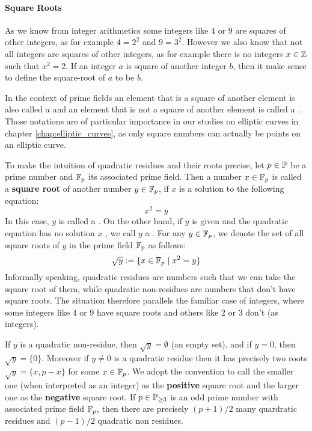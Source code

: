 \paragraph{Square Roots} As we know from integer arithmetics some integers like $4$ or $9$ are squares of other integers, as for example $4=2^2$ and $9=3^2$. However we also know that not all integers are squares of other integers, as for example there is no integers $x\in\mathbb{Z}$ such that $x^2=2$. If an integer $a$ is square of another integer $b$, then it make sense to define the square-root of $a$ to be $b$.

In the context of prime fields an element that is a square of another element is also called a  and an element that is not a square of another element is called a . Those notations are of particular importance in our studies on elliptic curves in chapter \ref{chap:elliptic_curves}, as only square numbers can actually be points on an elliptic curve.

To make the intuition of quadratic residues and their roots precise, let $p \in \mathbb{P} $ be a prime number and $\mathbb{F}_p $ its associated prime field. Then a number $x\in \mathbb{F}_p$ is called a \textbf{square root} of another number $y\in\mathbb{F}_p$, if $x$ is a solution to the following equation:
\begin{equation}
x^2 = y
\end{equation}
In this case, $y$ is called a . On the other hand, if $y$ is given and the quadratic equation has no solution $x$ , we call $ y $ a . For any $ y \in \mathbb{F}_p $, we denote the set of all square roots of $ y $ in the prime field $ \mathbb{F}_p $ as follows:
\begin{equation}
\sqrt{y}: = \{x \in \mathbb{F}_p \; | \; x^2 = y \}
\end{equation}
Informally speaking, quadratic residues are numbers such that we can take the square root of them, while quadratic non-residues are numbers that don't have square roots. The situation therefore parallels the familiar case of integers, where some integers like $4$ or $9$ have square roots and others like $2$ or $3$ don't (as integers).

If $ y $ is a quadratic non-residue, then $ \sqrt{y} = \emptyset $ (an empty set), and if $ y = 0 $, then $ \sqrt{y} = \{0 \} $. Moreover if $y\neq 0$ is a quadratic residue then it has precisely two roots $\sqrt{y}=\{x,p-x\}$ for some $x\in \mathbb{F}_p$. We adopt the convention to call the smaller one (when interpreted as an integer) as the \textbf{positive} square root and the larger one as the \textbf{negative} square root. If $ p \in \mathbb{P}_{\geq 3} $ is an odd prime number with associated prime field $\mathbb{F}_p$, then there are precisely $(p+1)/2$ many quardratic residues and $(p-1)/2$ quadratic non residues.

